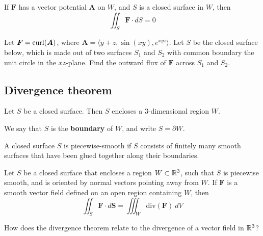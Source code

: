 \begin{corollary}
    If $\bm{F}$ has a vector potential $\bm{A}$ on $W$, and $S$ is a closed surface in $W$, then
    $$\iint_S \bm{F} \cdot dS = 0$$
    \end{corollary}

\begin{example}
    Let $\bm{F} = \textnormal{curl}(\bm{A})$, where $\bm{A} = \langle y+z, \sin(xy), e^{xyz} \rangle$.  Let $S$ be the closed surface below, which is made out of two surfaces $S_1$ and $S_2$ with common boundary the unit circle in the $xz$-plane.
%    
    Find the outward flux of $\bm{F}$ across $S_1$ and $S_2$.
\end{example}


\subsection{Divergence theorem}

\begin{definition}
    Let $S$ be a closed surface.  Then $S$ encloses a 3-dimensional region $W$.
    
    \vspace{1em}
    We say that $S$ is the \textbf{boundary} of $W$, and write $S = \partial W$.
    \end{definition}

\begin{definition}
    A closed surface $S$ is piecewise-smooth if $S$ consists of finitely many smooth surfaces that have been glued together along their boundaries.
    \end{definition}

\begin{theorem}
    Let $S$ be a closed surface that encloses a region $W \subset \mathbb{R}^3$, such that $S$ is piecewise smooth, and is oriented by normal vectors pointing away from $W$.  If $\bm{F}$ is a smooth vector field defined on an open region containing $W$, then 
    $$\iint_S \bm{F} \cdot d\bm{S} = \iiint_W \text{div}(\bm{F}) \ dV$$
    \end{theorem}

\begin{motivating}
    How does the divergence theorem relate to the divergence of a vector field in $\mathbb{R}^3$?
\end{motivating}

